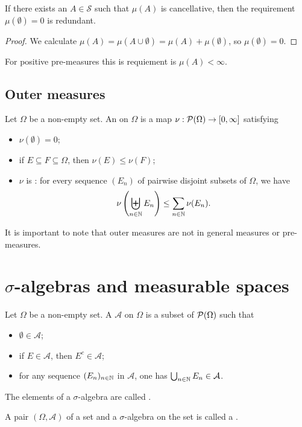 \begin{lemma} \label{emptysetNullset}
If there exists an $A\in \mathcal{S}$ such that $\mu(A)$ is cancellative, then the requirement $\mu(\emptyset) = 0$ is redundant.
\end{lemma}
\begin{proof}
We calculate $\mu(A) = \mu(A \cup \emptyset) = \mu(A) + \mu(\emptyset)$, so $\mu(\emptyset) = 0$.
\end{proof}
For positive pre-measures this is requiement is $\mu(A) < \infty$.


\subsection{Outer measures}
\begin{definition}
Let $\Omega$ be a non-empty set. An  on $\Omega$ is a map $\nu: \operatorname{\mathcal{P}}(\Omega)\to [0,\infty]$ satisfying
\begin{itemize}
\item $\nu(\emptyset) = 0$;
\item if $E\subseteq F\subseteq \Omega$, then $\nu(E)\leq \nu(F)$;
\item $\nu$ is : for every sequence $(E_n)$ of pairwise disjoint subsets of $\Omega$, we have
\[ \nu\left(\biguplus_{n\in\mathbb{N}}E_n\right) \leq \sum_{n\in\mathbb{N}}\nu(E_n). \]
\end{itemize}
\end{definition}
It is important to note that outer measures are not in general measures or pre-measures.



\section{$\sigma$-algebras and measurable spaces}
\begin{definition}
Let $\Omega$ be a non-empty set. A  $\mathcal{A}$ on $\Omega$ is a subset of $\operatorname{\mathcal{P}}(\Omega)$ such that
\begin{itemize}
\item $\emptyset \in \mathcal{A}$;
\item if $E\in \mathcal{A}$, then $E^c\in \mathcal{A}$;
\item for any sequence $(E_n)_{n\in\mathbb{N}}$ in $\mathcal{A}$, one has $\bigcup_{n\in\mathbb{N}}E_n \in \mathcal{A}$.
\end{itemize}
The elements of a $\sigma$-algebra are called .

A pair $(\Omega, \mathcal{A})$ of a set and a $\sigma$-algebra on the set is called a .
\end{definition}

